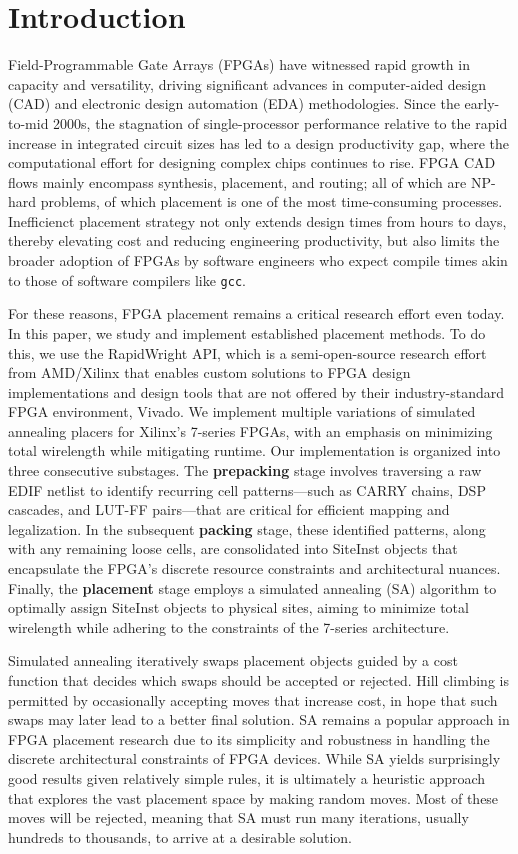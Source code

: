 \section{Introduction}

Field-Programmable Gate Arrays (FPGAs) have witnessed rapid growth in capacity and versatility, driving significant advances in computer-aided design (CAD) and electronic design automation (EDA) methodologies. 
Since the early-to-mid 2000s, the stagnation of single-processor performance relative to the rapid increase in integrated circuit sizes has led to a design productivity gap, where the computational effort for designing complex chips continues to rise. 
FPGA CAD flows mainly encompass synthesis, placement, and routing; all of which are NP-hard problems, of which placement is one of the most time-consuming processes. 
Inefficienct placement strategy not only extends design times from hours to days, thereby elevating cost and reducing engineering productivity, but also limits the broader adoption of FPGAs by software engineers who expect compile times akin to those of software compilers like {\tt gcc}. 

For these reasons, FPGA placement remains a critical research effort even today. 
In this paper, we study and implement established placement methods. 
To do this, we use the RapidWright API, which is a semi-open-source research effort from AMD/Xilinx that enables custom solutions to FPGA design implementations and design tools that are not offered by their industry-standard FPGA environment, Vivado. 
We implement multiple variations of simulated annealing placers for Xilinx's 7-series FPGAs, with an emphasis on minimizing total wirelength while mitigating runtime. 
Our implementation is organized into three consecutive substages. 
The \textbf{prepacking} stage involves traversing a raw EDIF netlist to identify recurring cell patterns—such as CARRY chains, DSP cascades, and LUT-FF pairs—that are critical for efficient mapping and legalization. 
In the subsequent \textbf{packing} stage, these identified patterns, along with any remaining loose cells, are consolidated into SiteInst objects that encapsulate the FPGA’s discrete resource constraints and architectural nuances. 
Finally, the \textbf{placement} stage employs a simulated annealing (SA) algorithm to optimally assign SiteInst objects to physical sites, aiming to minimize total wirelength while adhering to the constraints of the 7-series architecture. 

Simulated annealing iteratively swaps placement objects guided by a cost function that decides which swaps should be accepted or rejected. 
Hill climbing is permitted by occasionally accepting moves that increase cost, in hope that such swaps may later lead to a better final solution. 
SA remains a popular approach in FPGA placement research due to its simplicity and robustness in handling the discrete architectural constraints of FPGA devices. 
While SA yields surprisingly good results given relatively simple rules, it is ultimately a heuristic approach that explores the vast placement space by making random moves. 
Most of these moves will be rejected, meaning that SA must run many iterations, usually hundreds to thousands, to arrive at a desirable solution. 

